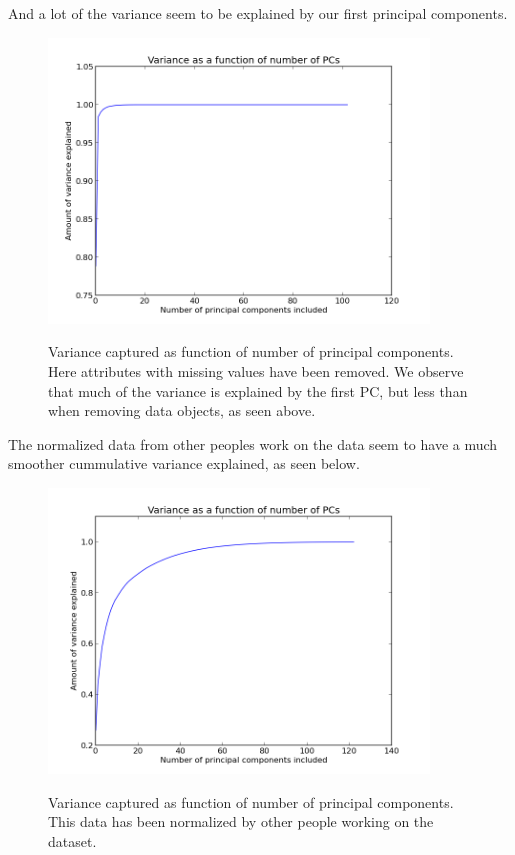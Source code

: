 And a lot of the variance seem to be explained by our first principal components.

\begin{figure}[H]
\centering
\includegraphics[width=0.9\textwidth]{variance/varianceattr-with-missings-removed_5-biggest-outliers-removed_}
\label{fig:lala2}
\caption{Variance captured as function of number of principal components. Here attributes with missing values have been removed. We observe that much of the variance is explained by the first PC, but less than when removing data objects, as seen above.}
\end{figure}

The normalized data from other peoples work on the data seem to have a much smoother cummulative variance explained, as seen below.


\begin{figure}[H]
\centering
\includegraphics[width=0.9\textwidth]{variancemissings-filled-w-means_0-biggest-outliers-removed_prenormed_}
\label{fig:lal3a}
\caption{Variance captured as function of number of principal components. This data has been normalized by other people working on the dataset.}
\end{figure}
